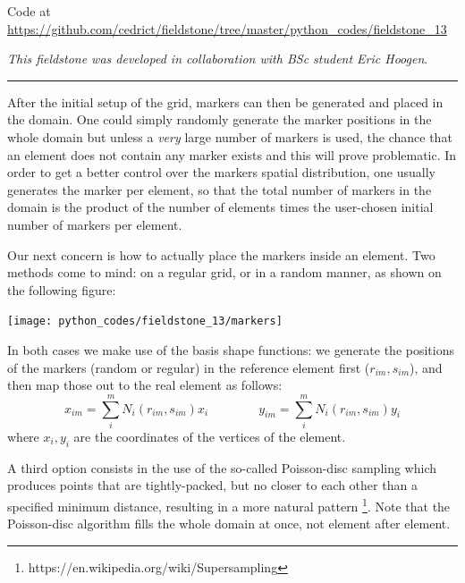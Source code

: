 

\begin{center}
Code at \url{https://github.com/cedrict/fieldstone/tree/master/python_codes/fieldstone_13}
\end{center}

{\sl This fieldstone was developed in collaboration with BSc student Eric Hoogen}. 

\par\noindent\rule{\textwidth}{0.4pt}



After the initial setup of the grid, markers can then be generated and placed in the domain. One could simply randomly generate 
the marker positions in the whole domain but unless a {\it very} large number of markers is used, the chance that an element does 
not contain any marker exists and this will prove problematic. In order to get a better control over the markers spatial distribution, 
one usually generates the marker per element, so that the total number of markers in the domain is the product of the number of 
elements times the user-chosen initial number of markers per element. 

Our next concern is how to actually place the markers inside an element. Two methods come to mind: on a regular grid, or in a random manner, 
as shown on the following figure:

\begin{center}
\texttt{[image: python\_codes/fieldstone\_13/markers]} 
\end{center}

In both cases we make use of the basis shape functions: we generate the positions of the markers (random or regular) in the reference
element first ($r_{im},s_{im}$), and then map those out to the real element as follows:
\begin{equation}
x_{im}=\sum_i^m N_i(r_{im},s_{im}) x_i
\quad\quad\quad\quad
y_{im}=\sum_i^m N_i(r_{im},s_{im}) y_i
\end{equation}
where $x_i,y_i$ are the coordinates of the vertices of the element.

A third option consists in the use of the so-called Poisson-disc sampling which 
produces points that are tightly-packed, but no closer to each other than 
a specified minimum distance, resulting in a more natural pattern 
\footnote{https://en.wikipedia.org/wiki/Supersampling}. Note that 
the Poisson-disc algorithm fills the whole domain at once, not element after element.

